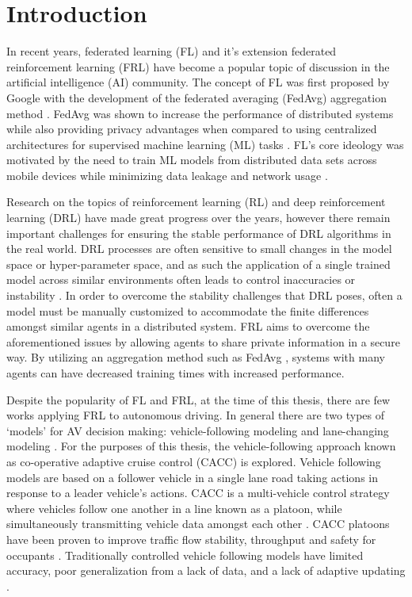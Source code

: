\chapter{Introduction}
\pagestyle{myfancy}
In recent years, federated learning (FL) and it's extension federated reinforcement learning
(FRL) have become a popular topic of discussion in the artificial intelligence (AI)
community.  The concept of FL was first proposed by Google with the development of the
federated averaging (FedAvg) aggregation method \cite{McMahan2016FederatedLO}.
FedAvg was shown to increase the performance of distributed systems while also providing
privacy advantages when compared to using centralized architectures for supervised machine
learning (ML) tasks \cite{Konecny2015, BrendanMcMahan2017a, McMahan2016FederatedLO}.
FL's core ideology was motivated by the need to train ML models from distributed data sets
across mobile devices while minimizing data leakage and network usage
\cite{McMahan2016FederatedLO}.

Research on the topics of reinforcement learning (RL) and deep reinforcement learning (DRL)
have made great progress over the years, however there remain important challenges for
ensuring the stable performance of DRL algorithms in the real world. DRL processes are
often sensitive to small changes in the model space or hyper-parameter space, and as such
the application of a single trained model across similar environments often leads to control
inaccuracies or instability \cite{Yang2019a, Lim2020}.   In order to overcome the
stability challenges that DRL poses, often a model must be manually customized to
accommodate the finite differences amongst similar agents in a distributed system.
FRL aims to overcome the aforementioned issues by allowing agents to share private
information in a secure way.  By utilizing an aggregation method such as FedAvg
\cite{McMahan2016FederatedLO}, systems with many agents can have decreased training
times with increased performance.

Despite the popularity of FL and FRL, at the time of this thesis, there are few works applying FRL to autonomous
driving.  In general there are two types of `models' for AV decision making:
vehicle-following modeling and lane-changing modeling \cite{Ye2019}. For the purposes of
this thesis, the vehicle-following approach known as co-operative adaptive cruise control
(CACC) is explored. Vehicle following models are based on a follower vehicle in a single lane road taking actions
in response to a leader vehicle's actions\cite{Zhu2018}.  CACC is a
multi-vehicle control strategy where vehicles follow one another in a line known as a
platoon, while simultaneously transmitting vehicle data amongst each other \cite{Song2020}.
CACC platoons have been proven to improve traffic flow stability, throughput and safety
for occupants \cite{Song2020, Chu2019b}.  Traditionally controlled vehicle following
models have limited accuracy, poor generalization from a lack of data, and a lack of
adaptive updating \cite{Zhu2018}.


